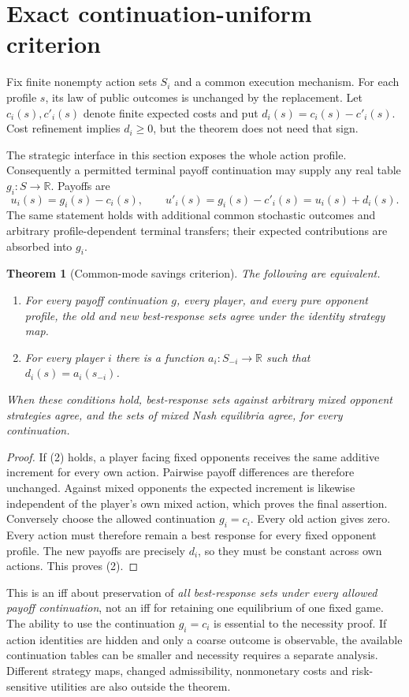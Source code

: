 \documentclass[11pt]{article}
\newtheorem{theorem}{Theorem}
\begin{document}
\section{Exact continuation-uniform criterion}
Fix finite nonempty action sets \(S_i\) and a common execution mechanism. For each profile \(s\), its law of public outcomes is unchanged by the replacement. Let \(c_i(s),c'_i(s)\) denote finite expected costs and put
\(d_i(s)=c_i(s)-c'_i(s)\). Cost refinement implies \(d_i\geq0\), but the theorem does not need that sign.

The strategic interface in this section exposes the whole action profile. Consequently a permitted terminal payoff continuation may supply any real table \(g_i:S\to\mathbb R\). Payoffs are
\[
 u_i(s)=g_i(s)-c_i(s),\qquad
 u'_i(s)=g_i(s)-c'_i(s)=u_i(s)+d_i(s).
\]
The same statement holds with additional common stochastic outcomes and arbitrary profile-dependent terminal transfers; their expected contributions are absorbed into \(g_i\).

\begin{theorem}[Common-mode savings criterion]\label{thm:common}
The following are equivalent.
\begin{enumerate}
\item For every payoff continuation \(g\), every player, and every pure opponent profile, the old and new best-response sets agree under the identity strategy map.
\item For every player \(i\) there is a function \(a_i:S_{-i}\to\mathbb R\) such that \(d_i(s)=a_i(s_{-i})\).
\end{enumerate}
When these conditions hold, best-response sets against arbitrary mixed opponent strategies agree, and the sets of mixed Nash equilibria agree, for every continuation.
\end{theorem}
\begin{proof}
If (2) holds, a player facing fixed opponents receives the same additive increment for every own action. Pairwise payoff differences are therefore unchanged. Against mixed opponents the expected increment is likewise independent of the player's own mixed action, which proves the final assertion.
Conversely choose the allowed continuation \(g_i=c_i\). Every old action gives zero. Every action must therefore remain a best response for every fixed opponent profile. The new payoffs are precisely \(d_i\), so they must be constant across own actions. This proves (2).
\end{proof}

This is an iff about preservation of \emph{all best-response sets under every allowed payoff continuation}, not an iff for retaining one equilibrium of one fixed game. The ability to use the continuation \(g_i=c_i\) is essential to the necessity proof. If action identities are hidden and only a coarse outcome is observable, the available continuation tables can be smaller and necessity requires a separate analysis. Different strategy maps, changed admissibility, nonmonetary costs and risk-sensitive utilities are also outside the theorem.
\end{document}
